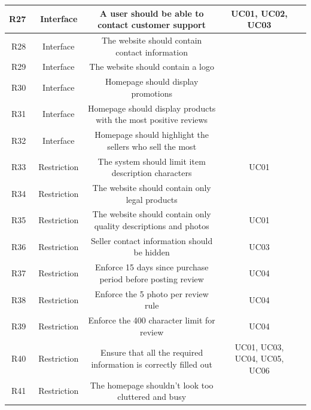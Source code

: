 \documentclass[11pt]{article}
\newcounter{use case ID}
\newcounter{req ID}
\begin{document}
\begin{table}[H]
\begin{adjustbox}{width=\columnwidth,center}
\begin{tabular}{|r | c| c | c| c|}
                \hline
                R27 & \ Interface & A user should be able to contact customer support & UC01, UC02, UC03 &  \\
                \hline
                R28 & \ Interface & The website should contain contact \index{information}information & &  \\
                \hline
                R29 & \ Interface & The website should contain a logo & &  \\
                \hline
                R30 & \ Interface & Homepage should display promotions & &  \\
                \hline
                R31 & \ Interface & Homepage should display \index{product}products with the most positive \index{review}reviews & &  \\
                \hline
                R32 & \ Interface & Homepage should highlight the \index{seller}sellers who sell the most & &  \\
                \hline
                R33 & \ Restriction & The system should limit item description characters & UC01 &  \\
                \hline
                R34 & \ Restriction & The website should contain only legal \index{product}products & &  \\
                \hline
                R35 & \ Restriction & The website should contain only quality descriptions and photos & UC01 &  \\
                \hline
                R36 & \ Restriction & \index{seller}Seller contact \index{information}information should be hidden & UC03 &  \\
                \hline
                R37 & \ Restriction & Enforce 15 days since purchase period before posting review & UC04 &  \\
                \hline
                R38 & \ Restriction & Enforce the 5 photo per \index{review}review rule & UC04 &  \\
                \hline
                R39 & \ Restriction & Enforce the 400 character limit for review & UC04 &  \\
                \hline
                R40 & \ Restriction & Ensure that all the required \index{information}information is correctly filled out & UC01, UC03, UC04, UC05, UC06 &  \\
                \hline
                R41 & \ Restriction & The homepage shouldn't look too cluttered and busy & &  \\
                \hline

\end{tabular}
\end{adjustbox}
\end{table}
\end{document}
